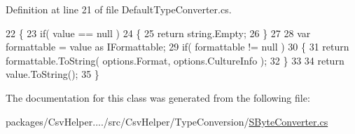 Definition at line 21 of file Default\-Type\-Converter.\-cs.


\begin{DoxyCode}
22         \{
23             \textcolor{keywordflow}{if}( value == null )
24             \{
25                 \textcolor{keywordflow}{return} string.Empty;
26             \}
27 
28             var formattable = value as IFormattable;
29             \textcolor{keywordflow}{if}( formattable != null )
30             \{
31                 \textcolor{keywordflow}{return} formattable.ToString( options.Format, options.CultureInfo );
32             \}
33 
34             \textcolor{keywordflow}{return} value.ToString();
35         \}
\end{DoxyCode}


The documentation for this class was generated from the following file\-:\begin{DoxyCompactItemize}
\item 
packages/\-Csv\-Helper..../src/\-Csv\-Helper/\-Type\-Conversion/\hyperlink{a00267}{S\-Byte\-Converter.\-cs}\end{DoxyCompactItemize}

